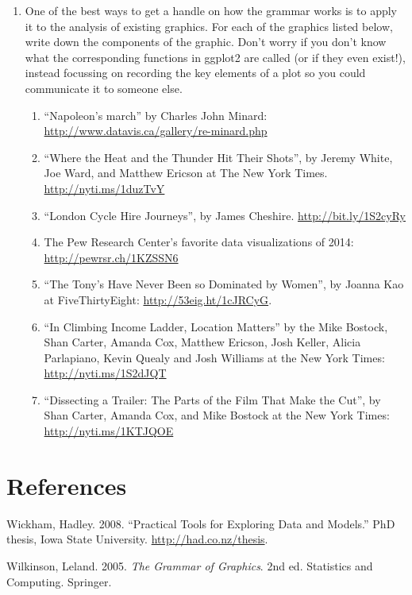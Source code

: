 \begin{enumerate}
\def\labelenumi{\arabic{enumi}.}
\item
  One of the best ways to get a handle on how the grammar works is to
  apply it to the analysis of existing graphics. For each of the
  graphics listed below, write down the components of the graphic. Don't
  worry if you don't know what the corresponding functions in ggplot2
  are called (or if they even exist!), instead focussing on recording
  the key elements of a plot so you could communicate it to someone
  else.

  \begin{enumerate}
  \def\labelenumii{\arabic{enumii}.}
  \item
    ``Napoleon's march'' by Charles John Minard:
    \url{http://www.datavis.ca/gallery/re-minard.php}
  \item
    ``Where the Heat and the Thunder Hit Their Shots'', by Jeremy White,
    Joe Ward, and Matthew Ericson at The New York Times.
    \url{http://nyti.ms/1duzTvY}
  \item
    ``London Cycle Hire Journeys'', by James Cheshire.
    \url{http://bit.ly/1S2cyRy}
  \item
    The Pew Research Center's favorite data visualizations of 2014:
    \url{http://pewrsr.ch/1KZSSN6}
  \item
    ``The Tony's Have Never Been so Dominated by Women'', by Joanna Kao
    at FiveThirtyEight: \url{http://53eig.ht/1cJRCyG}.
  \item
    ``In Climbing Income Ladder, Location Matters'' by the Mike Bostock,
    Shan Carter, Amanda Cox, Matthew Ericson, Josh Keller, Alicia
    Parlapiano, Kevin Quealy and Josh Williams at the New York Times:
    \url{http://nyti.ms/1S2dJQT}
  \item
    ``Dissecting a Trailer: The Parts of the Film That Make the Cut'',
    by Shan Carter, Amanda Cox, and Mike Bostock at the New York Times:
    \url{http://nyti.ms/1KTJQOE}
  \end{enumerate}
\end{enumerate}

\section*{References}\label{references}

\hypertarget{refs}{}
\hypertarget{ref-wickham:2008}{}
Wickham, Hadley. 2008. ``Practical Tools for Exploring Data and
Models.'' PhD thesis, Iowa State University.
\url{http://had.co.nz/thesis}.

\hypertarget{ref-wilkinson:2006}{}
Wilkinson, Leland. 2005. \emph{The Grammar of Graphics}. 2nd ed.
Statistics and Computing. Springer.
